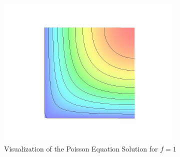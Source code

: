 \begin{figure}
\centerline{\includegraphics[width=\figwidth]{figures/FirstStepResult}}
\caption{Visualization of the Poisson Equation Solution for $f=1$}
\label{fig:FirstSteps.3}
\end{figure}


